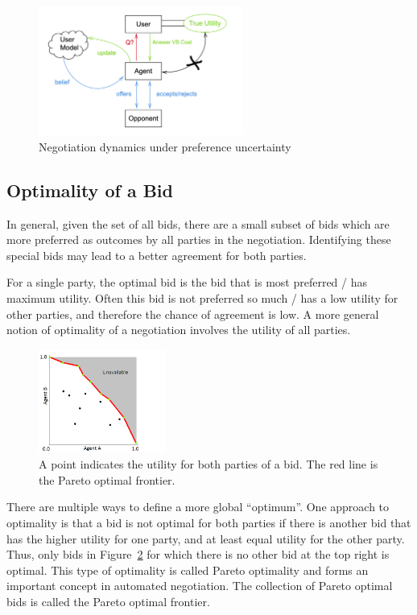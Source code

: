 \documentclass[]{article}
\begin{document}
\begin{figure}[htb]
	\centering
	\includegraphics[width=0.6\textwidth]{media/Uncertainty_Diagram.png}
	\caption{Negotiation dynamics under preference uncertainty}\label{Fig:uncertainty}
\end{figure}

\subsection{Optimality of a Bid}
In general, given the set of all bids, there are a small subset of bids which are more preferred as outcomes by all parties in the negotiation. Identifying these special bids may lead to a better agreement for both parties.

For a single party, the optimal bid is the bid that is most preferred / has maximum utility. Often this bid is not preferred so much / has a low utility for other parties, and therefore the chance of agreement is low. A more general notion of optimality of a negotiation involves the utility of all parties.

\begin{figure}[htb]
	\centering
	\includegraphics[width=0.37\textwidth]{media/image5.png}
\caption{A point indicates the utility for both parties of a bid. The red line is the Pareto optimal frontier.}\label{Fig:utility plot}
\end{figure}

There are multiple ways to define a more global ``optimum''. One approach to optimality is that a bid is not optimal for both parties if there is another bid that has the higher utility for one party, and at least equal utility for the other party. Thus, only bids in Figure~\ref{Fig:utility plot} for which there is no other bid at the top right is optimal. This type of optimality is called Pareto optimality and forms an important concept in automated negotiation. The collection of Pareto optimal bids is called the Pareto optimal frontier.
\end{document}
